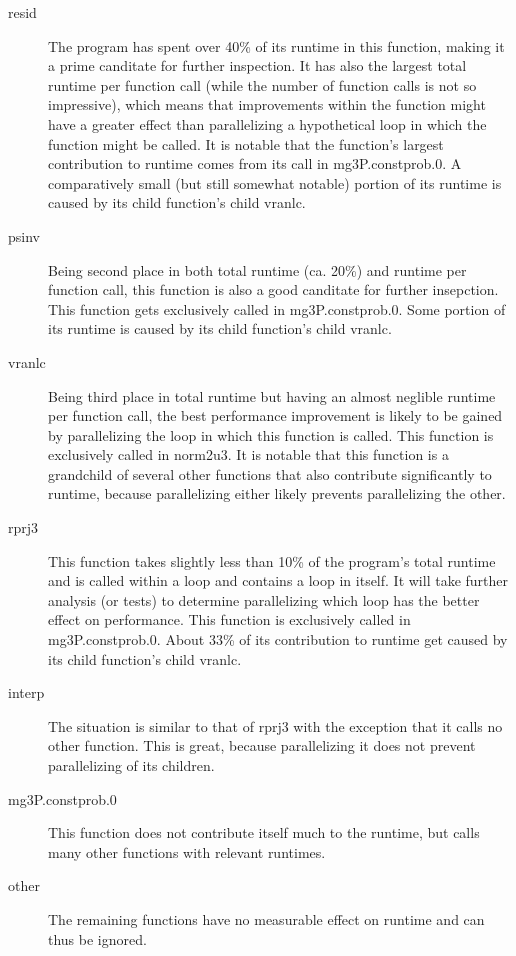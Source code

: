 \documentclass[parskip]{scrartcl}
\begin{document}
	\begin{description}
		\item[resid] The program has spent over 40\% of its runtime in this function, making it a prime canditate for further inspection. It has also the largest total runtime per function call (while the number of function calls is not so impressive), which means that improvements within the function might have a greater effect than parallelizing a hypothetical loop in which the function might be called. It is notable that the function's largest contribution to runtime comes from its call in mg3P.constprob.0. A comparatively small (but still somewhat notable) portion of its runtime is caused by its child function's child vranlc.
		
		\item[psinv] Being second place in both total runtime (ca. 20\%) and runtime per function call, this function is also a good canditate for further insepction. This function gets exclusively called in mg3P.constprob.0. Some portion of its runtime is caused by its child function's child vranlc.
		
		\item[vranlc] Being third place in total runtime but having an almost neglible runtime per function call, the best performance improvement is likely to be gained by parallelizing the loop in which this function is called. This function is exclusively called in norm2u3. It is notable that this function is a grandchild of several other functions that also contribute significantly to runtime, because parallelizing either likely prevents parallelizing the other.
		
		\item[rprj3] This function takes slightly less than 10\% of the program's total runtime and is called within a loop and contains a loop in itself. It will take further analysis (or tests) to determine parallelizing which loop has the better effect on performance. This function is exclusively called in mg3P.constprob.0. About  33\% of its contribution to runtime get caused by its child function's child vranlc.
		
		\item[interp] The situation is similar to that of rprj3 with the exception that it calls no other function. This is great, because parallelizing it does not prevent parallelizing of its children.
		
		\item[mg3P.constprob.0] This function does not contribute itself much to the runtime, but calls many other functions with relevant runtimes.
		
		\item[other] The remaining functions have no measurable effect on runtime and can thus be ignored.
	\end{description}
	
\end{document}

